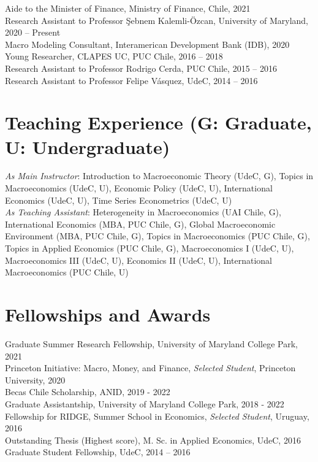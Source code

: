 \documentclass[11pt]{article}
\begin{document}
Aide to the Minister of Finance, Ministry of Finance, Chile, 2021 \\
Research Assistant to Professor \c{S}ebnem Kalemli-\"{O}zcan, University of Maryland, 2020 -- Present\\
Macro Modeling Consultant,  Interamerican Development Bank (IDB), 2020\\
Young Researcher, CLAPES UC, PUC Chile, 2016 -- 2018\\
Research Assistant to Professor Rodrigo Cerda, PUC Chile, 2015 -- 2016\\
Research Assistant to Professor Felipe V\'asquez, UdeC, 2014 -- 2016



\section*{Teaching Experience (\footnotesize G: Graduate, U: Undergraduate)}

\textit{As Main Instructor}: Introduction to Macroeconomic Theory (UdeC, G), Topics in Macroeconomics (UdeC, U), Economic Policy (UdeC, U), International Economics (UdeC, U), Time Series Econometrics (UdeC, U)\\
\textit{As Teaching Assistant}: Heterogeneity in Macroeconomics (UAI Chile, G), International Economics (MBA, PUC Chile, G), Global Macroeconomic Environment (MBA, PUC Chile, G), Topics in Macroeconomics (PUC Chile, G), Topics in Applied Economics (PUC Chile, G), Macroeconomics I (UdeC, U), Macroeconomics III (UdeC, U), Economics II (UdeC, U), International Macroeconomics (PUC Chile, U)


\section*{Fellowships and Awards}
Graduate Summer Research Fellowship, University of Maryland College Park, 2021\\
Princeton Initiative: Macro, Money, and Finance, \emph{Selected Student}, Princeton University, 2020\\
Becas Chile Scholarship, ANID, 2019 - 2022\\
Graduate Assistantship, University of Maryland College Park, 2018 - 2022\\
Fellowship for RIDGE, Summer School in Economics, \emph{Selected Student}, Uruguay, 2016\\
Outstanding Thesis (Highest score), M. Sc. in Applied Economics, UdeC, 2016\\
Graduate Student Fellowship, UdeC, 2014 -- 2016
\end{document}
